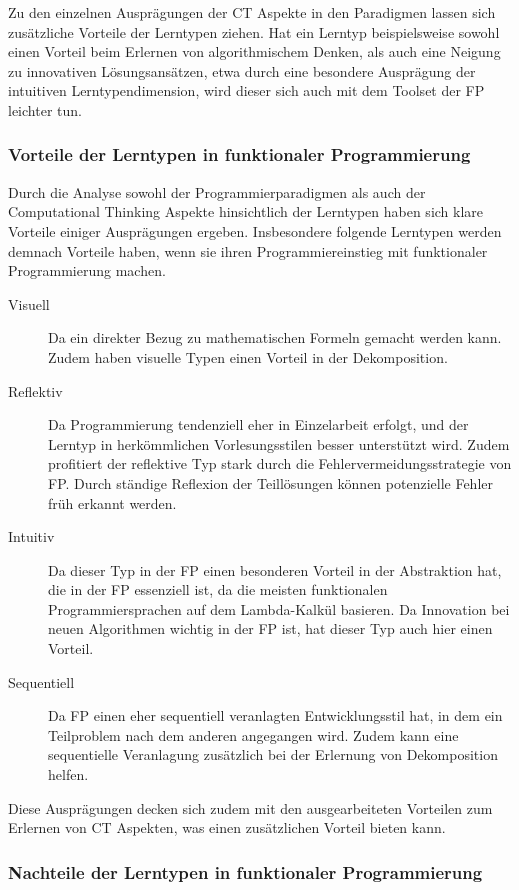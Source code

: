 Zu den einzelnen Ausprägungen der CT Aspekte in den Paradigmen lassen sich zusätzliche Vorteile der Lerntypen ziehen.
Hat ein Lerntyp beispielsweise sowohl einen Vorteil beim Erlernen von algorithmischem Denken, als auch eine Neigung zu innovativen Lösungsansätzen, etwa durch eine besondere Ausprägung der intuitiven Lerntypendimension, wird dieser sich auch mit dem Toolset der FP leichter tun.

\subsubsection{Vorteile der Lerntypen in funktionaler Programmierung}
Durch die Analyse sowohl der Programmierparadigmen als auch der Computational Thinking Aspekte hinsichtlich der Lerntypen haben sich klare Vorteile einiger Ausprägungen ergeben.
Insbesondere folgende Lerntypen werden demnach Vorteile haben, wenn sie ihren Programmiereinstieg mit funktionaler Programmierung machen.

\begin{description}
    \item[Visuell] Da ein direkter Bezug zu mathematischen Formeln gemacht werden kann. Zudem haben visuelle Typen einen Vorteil in der Dekomposition.
    \item[Reflektiv] Da Programmierung tendenziell eher in Einzelarbeit erfolgt, und der Lerntyp in herkömmlichen Vorlesungsstilen besser unterstützt wird. Zudem profitiert der reflektive Typ stark durch die Fehlervermeidungsstrategie von FP. Durch ständige Reflexion der Teillösungen können potenzielle Fehler früh erkannt werden.
    \item[Intuitiv] Da dieser Typ in der FP einen besonderen Vorteil in der Abstraktion hat, die in der FP essenziell ist, da die meisten funktionalen Programmiersprachen auf dem Lambda-Kalkül basieren. Da Innovation bei neuen Algorithmen wichtig in der FP ist, hat dieser Typ auch hier einen Vorteil.
    \item[Sequentiell] Da FP einen eher sequentiell veranlagten Entwicklungsstil hat, in dem ein Teilproblem nach dem anderen angegangen wird. Zudem kann eine sequentielle Veranlagung zusätzlich bei der Erlernung von Dekomposition helfen.
\end{description}

Diese Ausprägungen decken sich zudem mit den ausgearbeiteten Vorteilen zum Erlernen von CT Aspekten, was einen zusätzlichen Vorteil bieten kann.
\\
\subsubsection{Nachteile der Lerntypen in funktionaler Programmierung}

